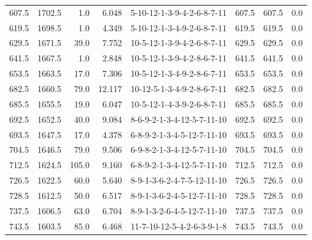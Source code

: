 \begin{tabular}{rrrrlrrr}
 607.5 &  1702.5 &            1.0 &              6.048 &  5-10-12-1-3-9-4-2-6-8-7-11 &         607.5 &           607.5 &       0.0 \\
 619.5 &  1698.5 &            1.0 &              4.349 &  5-10-12-1-3-4-9-2-6-8-7-11 &         619.5 &           619.5 &       0.0 \\
 629.5 &  1671.5 &           39.0 &              7.752 &  10-5-12-1-3-9-4-2-6-8-7-11 &         629.5 &           629.5 &       0.0 \\
 641.5 &  1667.5 &            1.0 &              2.848 &  10-5-12-1-3-9-4-2-8-6-7-11 &         641.5 &           641.5 &       0.0 \\
 653.5 &  1663.5 &           17.0 &              7.306 &  10-5-12-1-3-4-9-2-8-6-7-11 &         653.5 &           653.5 &       0.0 \\
 682.5 &  1660.5 &           79.0 &             12.117 &  10-12-5-1-3-4-9-2-8-6-7-11 &         682.5 &           682.5 &       0.0 \\
 685.5 &  1655.5 &           19.0 &              6.047 &  10-5-12-1-4-3-9-2-6-8-7-11 &         685.5 &           685.5 &       0.0 \\
 692.5 &  1652.5 &           40.0 &              9.084 &  8-6-9-2-1-3-4-12-5-7-11-10 &         692.5 &           692.5 &       0.0 \\
 693.5 &  1647.5 &           17.0 &              4.378 &  6-8-9-2-1-3-4-5-12-7-11-10 &         693.5 &           693.5 &       0.0 \\
 704.5 &  1646.5 &           79.0 &              9.506 &  6-9-8-2-1-3-4-12-5-7-11-10 &         704.5 &           704.5 &       0.0 \\
 712.5 &  1624.5 &          105.0 &              9.160 &  6-8-9-2-1-3-4-12-5-7-11-10 &         712.5 &           712.5 &       0.0 \\
 726.5 &  1622.5 &           60.0 &              5.640 &  8-9-1-3-6-2-4-7-5-12-11-10 &         726.5 &           726.5 &       0.0 \\
 728.5 &  1612.5 &           50.0 &              6.517 &  8-9-1-3-6-2-4-5-12-7-11-10 &         728.5 &           728.5 &       0.0 \\
 737.5 &  1606.5 &           63.0 &              6.704 &  8-9-1-3-2-6-4-5-12-7-11-10 &         737.5 &           737.5 &       0.0 \\
 743.5 &  1603.5 &           85.0 &              6.468 &  11-7-10-12-5-4-2-6-3-9-1-8 &         743.5 &           743.5 &       0.0 \\

\end{tabular}
